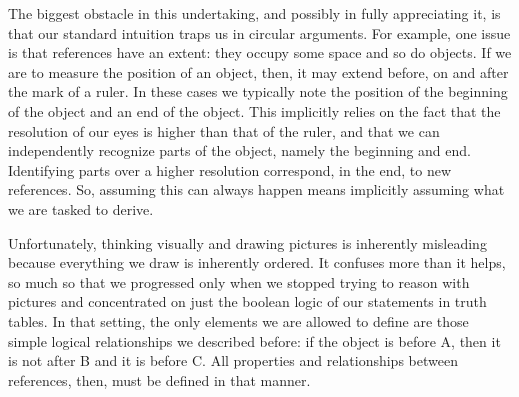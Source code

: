 \documentclass[12pt]{iopart}
\begin{document}
The biggest obstacle in this undertaking, and possibly in fully appreciating it, is that our standard intuition traps us in circular arguments. For example, one issue is that references have an extent: they occupy some space and so do objects. If we are to measure the position of an object, then, it may extend before, on and after the mark of a ruler. In these cases we typically note the position of the beginning of the object and an end of the object. This implicitly relies on the fact that the resolution of our eyes is higher than that of the ruler, and that we can independently recognize parts of the object, namely the beginning and end. Identifying parts over a higher resolution correspond, in the end, to new references. So, assuming this can always happen means implicitly assuming what we are tasked to derive.

Unfortunately, thinking visually and drawing pictures is inherently misleading because everything we draw is inherently ordered. It confuses more than it helps, so much so that we progressed only when we stopped trying to reason with pictures and concentrated on just the boolean logic of our statements in truth tables. In that setting, the only elements we are allowed to define are those simple logical relationships we described before: if the object is before A, then it is not after B and it is before C. All properties and relationships between references, then, must be defined in that manner.
\end{document}
